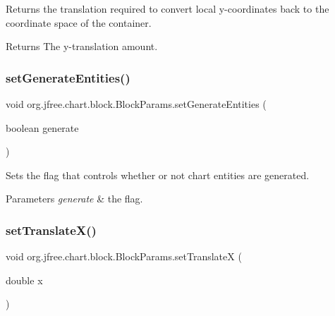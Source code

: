Returns the translation required to convert local y-\/coordinates back to the coordinate space of the container.

\begin{DoxyReturn}{Returns}
The y-\/translation amount. 
\end{DoxyReturn}
\mbox{\label{classorg_1_1jfree_1_1chart_1_1block_1_1_block_params_a66ea957ee6b80277218fc7fa382026a4}} 
\subsubsection{\texorpdfstring{set\+Generate\+Entities()}{setGenerateEntities()}}
{\footnotesize\ttfamily void org.\+jfree.\+chart.\+block.\+Block\+Params.\+set\+Generate\+Entities (\begin{DoxyParamCaption}\item[{boolean}]{generate }\end{DoxyParamCaption})}

Sets the flag that controls whether or not chart entities are generated.


\begin{DoxyParams}{Parameters}
{\em generate} & the flag. \\
\hline
\end{DoxyParams}
\mbox{\label{classorg_1_1jfree_1_1chart_1_1block_1_1_block_params_aeed14a7eaf248e4f312a80c4e5357194}} 
\subsubsection{\texorpdfstring{set\+Translate\+X()}{setTranslateX()}}
{\footnotesize\ttfamily void org.\+jfree.\+chart.\+block.\+Block\+Params.\+set\+TranslateX (\begin{DoxyParamCaption}\item[{double}]{x }\end{DoxyParamCaption})}

